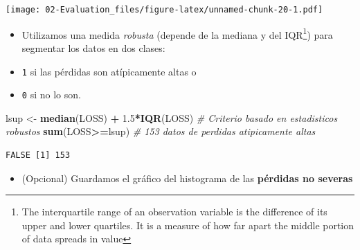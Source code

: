\documentclass[]{book}
\newenvironment{Shaded}{\begin{snugshade}}{\end{snugshade}}
\newcommand{\CommentTok}[1]{\textcolor[rgb]{0.56,0.35,0.01}{\textit{#1}}}
\newcommand{\DataTypeTok}[1]{\textcolor[rgb]{0.13,0.29,0.53}{#1}}
\newcommand{\DecValTok}[1]{\textcolor[rgb]{0.00,0.00,0.81}{#1}}
\newcommand{\FloatTok}[1]{\textcolor[rgb]{0.00,0.00,0.81}{#1}}
\newcommand{\KeywordTok}[1]{\textcolor[rgb]{0.13,0.29,0.53}{\textbf{#1}}}
\newcommand{\NormalTok}[1]{#1}
\newcommand{\OperatorTok}[1]{\textcolor[rgb]{0.81,0.36,0.00}{\textbf{#1}}}
\newcommand{\StringTok}[1]{\textcolor[rgb]{0.31,0.60,0.02}{#1}}
\providecommand{\tightlist}{%
  \setlength{\itemsep}{0pt}\setlength{\parskip}{0pt}}
\let\rmarkdownfootnote\footnote%
\def\footnote{\protect\rmarkdownfootnote}
\begin{document}
\texttt{[image: 02-Evaluation\_files/figure-latex/unnamed-chunk-20-1.pdf]}

\begin{itemize}
\tightlist
\item
  Utilizamos una medida \emph{robusta} (depende de la mediana y del IQR\footnote{The interquartile range of an observation variable is the difference of its upper and lower quartiles. It is a measure of how far apart the middle portion of data spreads in value}) para segmentar los datos en dos clases:
\item
  \texttt{1} si las pérdidas son atípicamente altas o
\item
  \texttt{0} si no lo son.
\end{itemize}

\begin{Shaded}
\begin{Highlighting}[]
\NormalTok{lsup <-}\StringTok{ }\KeywordTok{median}\NormalTok{(LOSS) }\OperatorTok{+}\StringTok{ }\FloatTok{1.5}\OperatorTok{*}\KeywordTok{IQR}\NormalTok{(LOSS) }\CommentTok{# Criterio basado en estadisticos robustos}
\KeywordTok{sum}\NormalTok{(LOSS}\OperatorTok{>=}\NormalTok{lsup) }\CommentTok{# 153 datos de perdidas atipicamente altas}
\end{Highlighting}
\end{Shaded}

\begin{verbatim}
FALSE [1] 153
\end{verbatim}

\begin{itemize}
\tightlist
\item
  (Opcional) Guardamos el gráfico del histograma de las \textbf{pérdidas no severas}
\end{itemize}

\begin{Shaded}
\end{Shaded}
\end{document}
